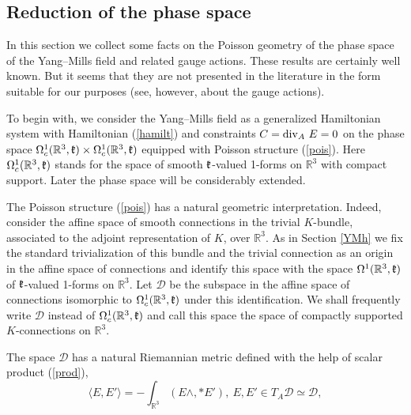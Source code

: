 \documentclass{amsart}
\begin{document}


\subsection{Reduction of the phase space}\label{YMred}



In this section we collect some facts on the Poisson geometry of the phase
space of the Yang--Mills field and related gauge actions. These results are certainly well
known.
But it seems that they are not presented in the literature in the form suitable for our
purposes (see, however, \cite{Sing} about the gauge actions).

To begin with, we consider the Yang--Mills field as a generalized Hamiltonian system with
Hamiltonian (\ref{hamilt}) and constraints $C={\rm div}_A~E=0$ on the phase space
$\Omega^1_c(\mathbb{R}^{3},\mathfrak k)\times \Omega^1_c(\mathbb{R}^{3},\mathfrak k)$ equipped
with Poisson structure (\ref{pois}). Here $\Omega^1_c(\mathbb{R}^{3},\mathfrak k)$
stands for the space of smooth $\mathfrak k$-valued 1-forms on $\mathbb{R}^{3}$ with
compact support. Later the phase space will be considerably extended.

The Poisson structure (\ref{pois}) has a natural geometric interpretation.
Indeed, consider the affine space  of smooth connections
in the trivial $K$-bundle, associated to
the adjoint representation of $K$, over ${\mathbb R}^{3}$. As in Section
\ref{YMh} we fix the standard trivialization of this bundle and the
trivial connection as an origin in the affine space of connections and identify this space
with the space $\Omega^1(\mathbb{R}^{3},\mathfrak k)$ of $\mathfrak k$-valued 1-forms on ${\mathbb
R}^{3}$. Let $\mathcal{D}$ be the subspace in the affine space of
connections isomorphic to $\Omega^1_c(\mathbb{R}^{3},\mathfrak k)$ under this
identification. We shall frequently write $\mathcal{D}$ instead of
$\Omega^1_c(\mathbb{R}^{3},\mathfrak k)$ and call this space the space of compactly
supported $K$-connections on $\mathbb{R}^{3}$.

The space $\mathcal{D}$ has a natural Riemannian metric defined with the help of
scalar product (\ref{prod}),
\begin{equation}\label{riemann}
\langle E,E'\rangle =-\int_{\mathbb{R}^{3}}(E\wedge,*E'),~E,E'\in T_A\mathcal{D}\simeq\mathcal{D},
\end{equation}
\end{document}
